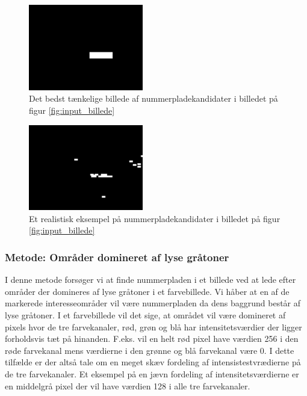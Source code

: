 \begin{figure}[htp]
\centering
\includegraphics[width=5cm]{system/illu/binary_ideal.png} 
\caption{Det bedst tænkelige billede af nummerpladekandidater i billedet på figur \ref{fig:input_billede}}
\label{fig:binary_ideal}
\end{figure}


\begin{figure}[htp]
\centering
\includegraphics[width=5cm]{system/illu/binary_real.png} 
\caption{Et realistisk eksempel på nummerpladekandidater i billedet på figur \ref{fig:input_billede}}
\label{fig:binary_real}
\end{figure}


\subsubsection{Metode: Områder domineret af lyse gråtoner}
I denne metode forsøger vi at finde nummerpladen i et billede ved at lede efter områder der domineres af lyse gråtoner i et farvebillede. Vi håber at en af de markerede interesseområder vil være nummerpladen da dens baggrund består af lyse gråtoner. I et farvebillede vil det sige, at området vil være domineret af pixels hvor de tre farvekanaler, rød, grøn og blå har intensitetsværdier der ligger forholdsvis tæt på hinanden. F.eks. vil en helt rød pixel have værdien 256 i den røde farvekanal mens værdierne i den grønne og blå farvekanal være 0. I dette tilfælde er der altså tale om en meget skæv fordeling af intensistestvrædierne på de tre farvekanaler. Et eksempel på en jævn fordeling af intensitetsværdierne er en middelgrå pixel der vil have værdien 128 i alle tre farvekanaler.

